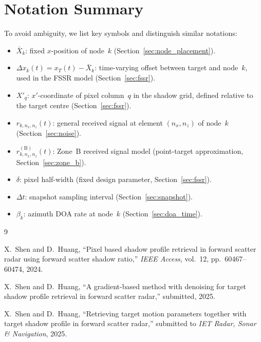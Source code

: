 \documentclass[11pt,a4paper]{article}
\begin{document}
\section{Notation Summary}
\label{sec:notation}

To avoid ambiguity, we list key symbols and distinguish similar
notations:
\begin{itemize}
  \item $\bar{X}_k$: fixed $x$-position of node~$k$
    (Section~\ref{sec:node_placement}).
  \item $\Delta x_k(t) = x_T(t)-\bar{X}_k$: time-varying offset
    between target and node~$k$, used in the FSSR model
    (Section~\ref{sec:fssr}).
  \item $X'_q$: $x'$-coordinate of pixel column~$q$ in the shadow
    grid, defined relative to the target centre
    (Section~\ref{sec:fssr}).
  \item $r_{k,n_x,n_z}(t)$: general received signal at element
    $(n_x,n_z)$ of node~$k$ (Section~\ref{sec:noise}).
  \item $r_{k,n_x,n_z}^{(\mathrm{B})}(t)$: Zone~B received signal
    model (point-target approximation,
    Section~\ref{sec:zone_b}).
  \item $\delta$: pixel half-width (fixed design parameter,
    Section~\ref{sec:fssr}).
  \item $\Delta t$: snapshot sampling interval
    (Section~\ref{sec:snapshot}).
  \item $\beta_k$: azimuth DOA rate at node~$k$
    (Section~\ref{sec:doa_time}).
\end{itemize}

\begin{thebibliography}{9}

X.~Shen and D.~Huang,
``Pixel based shadow profile retrieval in forward scatter radar using
forward scatter shadow ratio,''
\emph{IEEE Access}, vol.~12, pp.~60467--60474, 2024.

X.~Shen and D.~Huang,
``A gradient-based method with denoising for target shadow profile
retrieval in forward scatter radar,''
submitted, 2025.

X.~Shen and D.~Huang,
``Retrieving target motion parameters together with target shadow
profile in forward scatter radar,''
submitted to \emph{IET Radar, Sonar \& Navigation}, 2025.

\end{thebibliography}
\end{document}
